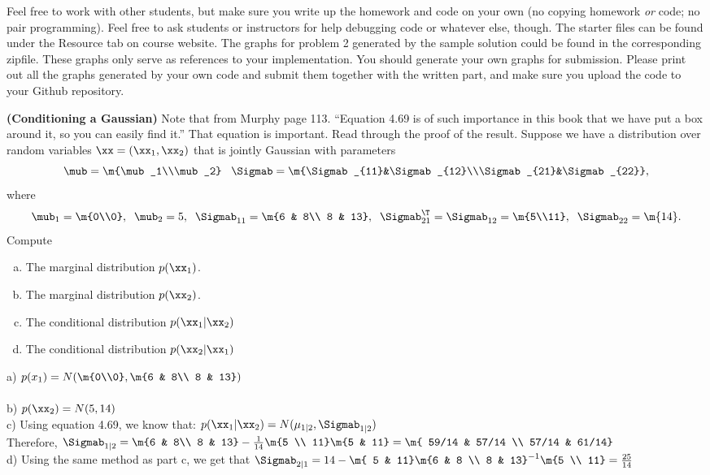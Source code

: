 \documentclass[12pt,letterpaper,fleqn]{hmcpset}
\begin{document}
Feel free to work with other students, but make sure you write up the homework
and code on your own (no copying homework \textit{or} code; no pair programming).
Feel free to ask students or instructors for help debugging code or whatever else,
though.
\newline
\newline
The starter files can be found under the Resource tab on course website. The graphs for problem 2 generated by the sample solution could be found in the corresponding zipfile. These graphs only serve as references to your implementation. You should generate your own graphs for submission. Please print out all the graphs generated by your own code and submit them together with the written part, and make sure you upload the code to your Github repository.

\begin{problem}[1]
\textbf{(Conditioning a Gaussian)} Note that from Murphy page 113. ``Equation 4.69
is of such importance in this book that we have put a box around it, so you can easily
find it.'' That equation is important. Read through the proof of the result.
Suppose we have a distribution over random variables $\xx = (\xx_1, \xx_2)$ that is
jointly Gaussian with parameters
\[
    \mub = \m{\mub_1\\\mub_2}\;\;\; \Sigmab = \m{\Sigmab_{11}&\Sigmab_{12}\\\Sigmab_{21}&\Sigmab_{22}},
\]
where
\[
    \mub_1 = \m{0\\0}, \;\; \mub_2 = 5, \;\; \Sigmab_{11} = \m{6 & 8\\ 8 & 13}, \;\; \Sigmab_{21}^\T = \Sigmab_{12} = \m{5\\11}, \;\; \Sigmab_{22} = \m{14}.
\]
Compute
\begin{enumerate}[(a)]
    \item The marginal distribution $p(\xx_1)$.
    \item The marginal distribution $p(\xx_2)$.
    \item The conditional distribution $p(\xx_1 | \xx_2)$
    \item The conditional distribution $p(\xx_2 | \xx_1)$
\end{enumerate}

\end{problem}
\begin{solution}
a) $ p(x_1) = N( \m{0\\0}, \m{6 & 8\\ 8 & 13}) $ \\ \\
b) $ p(\xx_2) = N(5,14) $ \\
c) Using equation 4.69, we know that: $p(\xx_1 | \xx_2) = N(\mu_{1|2}, \Sigmab_{1|2}) $ \\
Therefore, $ \Sigmab_{1|2} = \m{6 & 8\\ 8 & 13} - \frac{1}{14} \m{5 \\ 11} \m{5 & 11}  = \m{ 59/14 & 57/14 \\  57/14 & 61/14}$\\
d) Using the same method as part c, we get that $\Sigmab_{2|1} = 14 - \m{ 5 & 11} \m{6 & 8 \\ 8 & 13}^{-1} \m{5 \\ 11} = \frac{25}{14} $
\end{solution}
\end{document}
